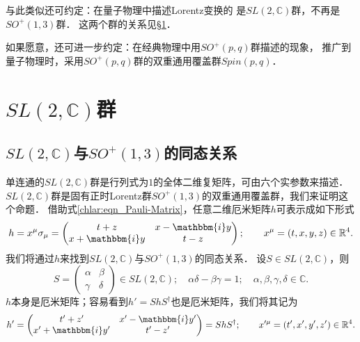 与此类似还可约定：{\kaishu 在量子物理中描述Lorentz变换的
    是$SL(2,\mathbb{C})$群，不再是$SO^{+}(1,3)$群．}
这两个群的关系见\S\ref{chlar:sec_SL2C}．

如果愿意，还可进一步约定：{\kaishu 在经典物理中用$SO^{+}(p,q)$群描述的现象，
推广到量子物理时，采用$SO^{+}(p,q)$群的双重通用覆盖群$Spin(p,q)$．}



\section{$SL(2,\mathbb{C})$群}\label{chlar:sec_SL2C}



\subsection{$SL(2,\mathbb{C})$与$SO^{+}(1,3)$的同态关系} \label{chlar:sec_slsoh}
单连通的$SL(2,\mathbb{C})$群是行列式为$1$的全体二维复矩阵，可由六个实参数来描述．
$SL(2,\mathbb{C})$群是固有正时Lorentz群$SO^{+}(1,3)$的双重通用覆盖群，我们来证明这个命题．
借助式\eqref{chlar:eqn_Pauli-Matrix}，任意二维厄米矩阵$h$可表示成如下形式
\begin{equation}\label{chlar:eqn_hslso}
    h = x^\mu \sigma_\mu
    =\begin{pmatrix}
        t+z & x- \mathbbm{i} y \\ x+ \mathbbm{i} y & t-z
    \end{pmatrix}; 
    \qquad x^\mu= (t,x,y,z) \in \mathbb{R}^4 .
\end{equation}
我们将通过$h$来找到$SL(2,\mathbb{C})$与$SO^{+}(1,3)$的同态关系．
设$S\in SL(2,\mathbb{C})$，则
\begin{equation}\label{chlar:eqn_sl2}
    S=\begin{pmatrix} \alpha & \beta \\ \gamma & \delta \end{pmatrix} \in SL(2,\mathbb{C}) ; 
    \quad \alpha \delta - \beta \gamma =1; 
    \quad \alpha , \beta ,\gamma , \delta \in \mathbb{C} .
\end{equation}
$h$本身是厄米矩阵；容易看到$h'=ShS^\dagger$也是厄米矩阵，我们将其记为
\begin{equation}\label{chlar:eqn_hpslso}
    h' =\begin{pmatrix}
        t'+z' & x'- \mathbbm{i} y' \\ x'+ \mathbbm{i} y' &   t'-z'
    \end{pmatrix} =ShS^\dagger; 
    \qquad x^{\prime\mu}= (t',x',y',z') \in \mathbb{R}^4 .
\end{equation}
